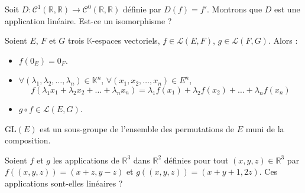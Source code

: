 \documentclass[a4paper,10pt]{report}
\begin{document}
\begin{ex} Soit $D : \mathcal{C}^1(\mathbb{R}, \mathbb{R}) \rightarrow \mathcal{C}^0(\mathbb{R}, \mathbb{R})$ définie par $D(f)=f'$. Montrons que $D$ est une application linéaire. Est-ce un isomorphisme ?


\vspace{5cm}
\end{ex}

\begin{prop}
Soient $E$, $F$ et $G$ trois $\mathbb{K}$-espaces vectoriels, $f \in \mathcal{L}(E,F)$, $g \in \mathcal{L}(F,G)$. Alors :

\begin{itemize}
\item $f(0_E)=0_F$.
\item $\forall (\lambda_1, \lambda_2, \ldots, \lambda_n) \in \mathbb{K}^n$, $\forall (x_1,x_2, \ldots, x_n) \in E^n$,
$$ f( \lambda_1x_1+ \lambda_2 x_2 + \ldots + \lambda_n x_n) = \lambda_1 f(x_1) + \lambda_2 f(x_2) + \ldots + \lambda_n f(x_n) $$
\item $g \circ f \in \mathcal{L}(E,G)$.
\end{itemize}
\end{prop}

\begin{rem} $\textrm{GL}(E)$ est un sous-groupe de l'ensemble des permutations de $E$ muni de la composition.
\end{rem}

\begin{exa} Soient $f$ et $g$ les applications de $\mathbb{R}^3$ dans $\mathbb{R}^2$ définies pour tout $(x,y,z) \in \mathbb{R}^3$ par $f((x,y,z))=(x+z,y-z)$ et $g((x,y,z))= (x+y+1,2z)$. Ces applications sont-elles linéaires ?
\end{exa} 
\end{document}
